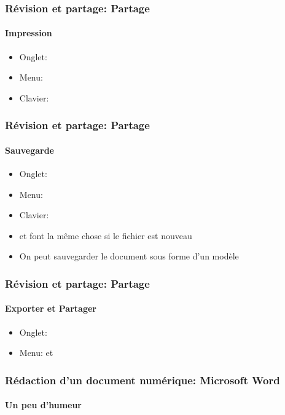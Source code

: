 \documentclass[xcolor=table]{beamer}
\begin{document}
\begin{frame}
\frametitle{Révision et partage: Partage}
\framesubtitle{Impression}

\begin{minipage}{0.61\textwidth}
	\begin{itemize}
		\item Onglet: 
		\item Menu: 
		\item Clavier: 
	\end{itemize}
\end{minipage}
\begin{minipage}{0.38\textwidth}
\end{minipage}

\end{frame}

\begin{frame}
\frametitle{Révision et partage: Partage}
\framesubtitle{Sauvegarde}

\begin{minipage}{0.61\textwidth}
	\begin{itemize}
		\item Onglet: 
		\item Menu: 
		\item Clavier: 
		\item {} et  font la même chose si le fichier est nouveau 
		\item On peut sauvegarder le document sous forme d'un modèle 
	\end{itemize}
\end{minipage}
\begin{minipage}{0.38\textwidth}
\end{minipage}

\end{frame}

\begin{frame}
\frametitle{Révision et partage: Partage}
\framesubtitle{Exporter et Partager}

\begin{minipage}{0.38\textwidth}
	\begin{itemize}
		\item Onglet: 
		\item Menu:  et 
	\end{itemize}
\end{minipage}
\begin{minipage}{0.30\textwidth}
\end{minipage}
\begin{minipage}{0.30\textwidth}
\end{minipage}

\end{frame}

\begin{frame}
\frametitle{Rédaction d'un document numérique: Microsoft Word}
\framesubtitle{Un peu d'humeur}


\end{frame}

\end{document}
